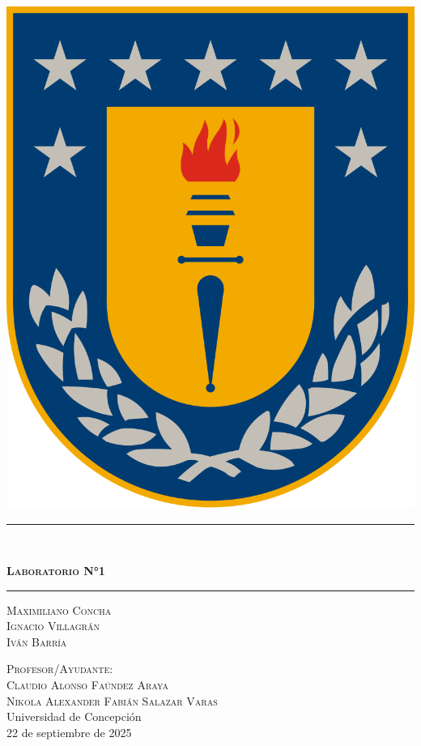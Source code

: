 \documentclass[12pt]{article}
\date{}
\begin{document}
\begin{titlepage}
    \raggedright
    \includegraphics[scale=0.1]{udec} %
    
    \vspace{3cm}
    
    \centering
    \rule{0.7\textwidth}{1pt} \\[0.5cm]
    {\Huge\bfseries \textsc{Laboratorio N°1} \par}
    \vspace{0.5cm}
    \rule{0.7\textwidth}{1pt}\par
    
    \vfill
    
    {\Large \textsc{Maximiliano Concha \\ Ignacio Villagrán \\ Iván Barría} \par}
    \vspace{0.5cm}
    {\Large \textsc{Profesor/Ayudante: \\ Claudio Alonso Faúndez Araya \\ Nikola Alexander Fabián Salazar Varas}}    \\
    \vspace{1cm}
    {\large Universidad de Concepción \\ 22 de septiembre de 2025}
\end{titlepage}
\newpage
\end{document}

